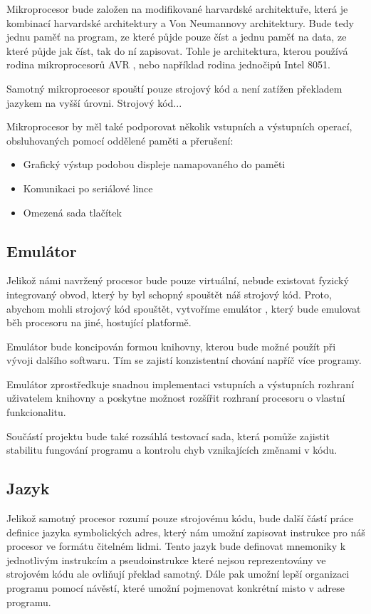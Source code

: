 Mikroprocesor bude založen na modifikované harvardské architektuře, která je kombinací harvardské architektury a Von Neumannovy architektury.  Bude tedy jednu paměť na program, ze které půjde pouze číst a jednu paměť na data, ze které půjde jak číst, tak do ní zapisovat. Tohle je architektura, kterou používá rodina mikroprocesorů AVR , nebo například rodina jednočipů Intel 8051. 

Samotný mikroprocesor spouští pouze strojový kód a není zatížen překladem jazykem na vyšší úrovni. Strojový kód...

Mikroprocesor by měl také podporovat několik vstupních a výstupních operací, obsluhovaných pomocí oddělené paměti a přerušení:

\begin{itemize}
	\item Grafický výstup podobou displeje namapovaného do paměti
	\item Komunikaci po seriálové lince
	\item Omezená sada tlačítek
\end{itemize}

\subsection{Emulátor}

Jelikož námi navržený procesor bude pouze virtuální, nebude existovat fyzický integrovaný obvod, který by byl schopný spouštět náš strojový kód. Proto, abychom mohli strojový kód spouštět, vytvoříme emulátor , který bude emulovat běh procesoru na jiné, hostující platformě.

Emulátor bude koncipován formou knihovny, kterou bude možné použít při vývoji dalšího softwaru. Tím se zajistí konzistentní chování napříč více programy.

Emulátor zprostředkuje snadnou implementaci vstupních a výstupních rozhraní uživatelem knihovny a poskytne možnost rozšířit rozhraní procesoru o vlastní funkcionalitu.

Součástí projektu bude také rozsáhlá testovací sada, která pomůže zajistit stabilitu fungování programu a kontrolu chyb vznikajících změnami v kódu. 

\subsection{Jazyk}

Jelikož samotný procesor rozumí pouze strojovému kódu, bude další částí práce definice jazyka symbolických adres, který nám umožní zapisovat instrukce pro náš procesor ve formátu čitelném lidmi. Tento jazyk bude definovat mnemoniky k jednotlivým instrukcím a pseudoinstrukce které nejsou reprezentovány ve strojovém kódu ale ovliňují překlad samotný. Dále pak umožní lepší organizaci programu pomocí návěstí, které umožní pojmenovat konkrétní misto v adrese programu.

